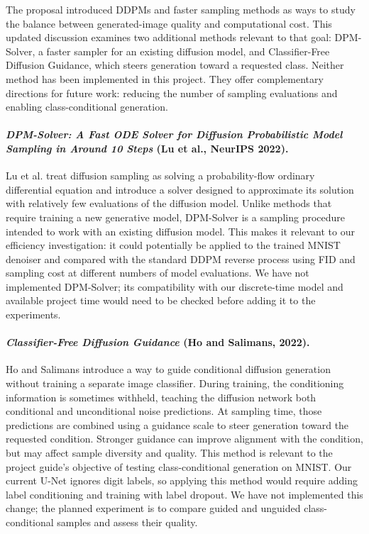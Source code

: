 \documentclass[11pt, letterpaper]{article}
\begin{document}
The proposal introduced DDPMs and faster sampling methods as ways to study the balance between generated-image quality and computational cost. This updated discussion examines two additional methods relevant to that goal: DPM-Solver, a faster sampler for an existing diffusion model, and Classifier-Free Diffusion Guidance, which steers generation toward a requested class. Neither method has been implemented in this project. They offer complementary directions for future work: reducing the number of sampling evaluations and enabling class-conditional generation.

\paragraph{\textit{DPM-Solver: A Fast ODE Solver for Diffusion Probabilistic Model Sampling in Around 10 Steps} (Lu et al., NeurIPS 2022).}
Lu et al. treat diffusion sampling as solving a probability-flow ordinary differential equation and introduce a solver designed to approximate its solution with relatively few evaluations of the diffusion model. Unlike methods that require training a new generative model, DPM-Solver is a sampling procedure intended to work with an existing diffusion model. This makes it relevant to our efficiency investigation: it could potentially be applied to the trained MNIST denoiser and compared with the standard DDPM reverse process using FID and sampling cost at different numbers of model evaluations. We have not implemented DPM-Solver; its compatibility with our discrete-time model and available project time would need to be checked before adding it to the experiments.

\paragraph{\textit{Classifier-Free Diffusion Guidance} (Ho and Salimans, 2022).}
Ho and Salimans introduce a way to guide conditional diffusion generation without training a separate image classifier. During training, the conditioning information is sometimes withheld, teaching the diffusion network both conditional and unconditional noise predictions. At sampling time, those predictions are combined using a guidance scale to steer generation toward the requested condition. Stronger guidance can improve alignment with the condition, but may affect sample diversity and quality. This method is relevant to the project guide's objective of testing class-conditional generation on MNIST. Our current U-Net ignores digit labels, so applying this method would require adding label conditioning and training with label dropout. We have not implemented this change; the planned experiment is to compare guided and unguided class-conditional samples and assess their quality.
\end{document}
